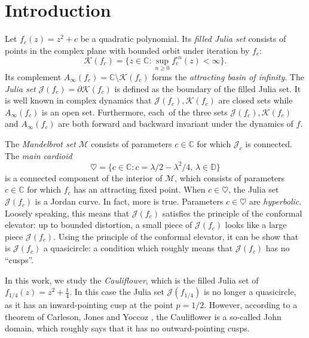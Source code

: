
\usepackage{subcaption}



\section{Introduction}

% 

Let $f_c(z) = z^2 + c$ be a quadratic polynomial. Its {\em filled Julia set} consists of points in the complex plane with bounded orbit
under iteration by $f_c$:
$$
\mathcal K(f_c) = \{z \in \mathbb{C} : \sup_{n \ge 0} f_c^{\circ n}(z) < \infty \}.
$$
Its complement $A_\infty(f_c) = \mathbb{C} \setminus \mathcal K(f_c)$ forms the {\em attracting basin of infinity}. The
 {\em Julia set} $\mathcal J(f_c) = \partial \mathcal K(f_c)$ is defined as the boundary of the filled Julia set. 
It is well known in complex dynamics that $\mathcal J(f_c), \mathcal K(f_c)$ are closed sets while $A_\infty(f_c)$ is an open set. Furthermore, each\
  of the three sets
$\mathcal J(f_c), \mathcal K(f_c)$ and $A_\infty(f_c)$ are both forward and backward invariant under the dynamics of $f$.
 
 The {\em Mandelbrot set} $\mathcal{M}$ consists of parameters $c \in \mathbb{C}$ for which $\mathcal J_c$ is connected.
The {\em main cardioid}
$$
\heartsuit = \bigl  \{c \in \mathbb{C}: c = \lambda/2 - \lambda^2/4,\, \lambda \in \mathbb{D} \bigr \}
$$
 is a connected component of the interior of $\mathcal M$, which consists of parameters $c \in \mathbb{C}$ for which $f_c$ has an attracting fixed point.
When $c \in \heartsuit$, the Julia set $\mathcal J(f_c)$ is a Jordan curve. In fact, more is true. Parameters $c \in \heartsuit$ are 
{\em hyperbolic}. Loosely speaking, this means that $\mathcal J(f_c)$ satisfies the principle of the conformal elevator: 
up to bounded distortion, a small piece of $\mathcal J(f_c)$ looks like a large piece $\mathcal J(f_c)$.
Using the principle of the conformal elevator, it can be show that is $\mathcal J(f_c)$ a quasicircle: a condition which roughly means that $\mathcal J(f_c)$ has no \enquote{cusps}.

In this work, we study the \emph{Cauliflower}\/, which is the filled Julia set of $f_{1/4}(z) = z^2+\frac{1}{4}$. In this case the Julia set
$\mathcal J(f_{1/4})$ is no longer a quasicircle, as it has an inward-pointing cusp at the point $p=1/2$.
However, according to a theorem of Carleson, Jones and Yoccoz \cite[Theorem 6.1]{carleson_julia_1994}, 
the Cauliflower is a so-called John domain, which roughly says that it has no outward-pointing cusps.


